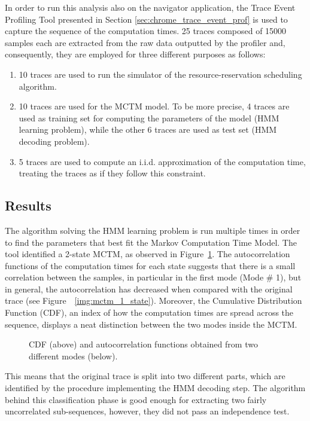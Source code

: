 In order to run this analysis also on the navigator application, the Trace Event
Profiling Tool presented in Section \ref{sec:chrome_trace_event_prof} is used
to capture the sequence of the computation times. 25 traces composed of 15000
samples each are extracted from the raw data outputted by the profiler and,
consequently, they are employed for three different purposes as follows:
\begin{enumerate}
    \item 10 traces are used to run the simulator of the resource-reservation
        scheduling algorithm.
    \item 10 traces are used for the MCTM model. To be more precise, 4 traces are used as
        training set for computing the parameters of the model (HMM learning
        problem), while the other 6 traces are used as test set (HMM decoding problem).
    \item 5 traces are used to compute an i.i.d. approximation of the computation time,
        treating the traces as if they follow this constraint.
\end{enumerate}


\subsection{Results}\label{sec:mctm_results}
The algorithm solving the HMM learning problem is run multiple times in order to
find the parameters that best fit the Markov Computation Time Model. The tool identified a 2-state MCTM, as observed in Figure~\ref{img:mctm_2_states}. The autocorrelation
functions of the computation times for each state suggests that there is a small correlation between the samples, in particular in the first mode (Mode \# 1), but in general, the autocorrelation has decreased when compared with the original trace (see Figure~~\ref{img:mctm_1_state}).
Moreover, the Cumulative Distribution Function (CDF), an index of how the computation
times are spread across the sequence, displays a neat distinction between
the two modes inside the MCTM.
\begin{figure}[!htb]
    \caption{CDF (above) and autocorrelation functions obtained from two
        different modes (below).}
    \label{img:mctm_2_states}
\end{figure}

This means that the original trace is split into two different parts, which
are identified by the procedure implementing the HMM decoding step. The algorithm
behind this classification phase is good enough for extracting two fairly
uncorrelated sub-sequences, however, they did not pass an independence test.

